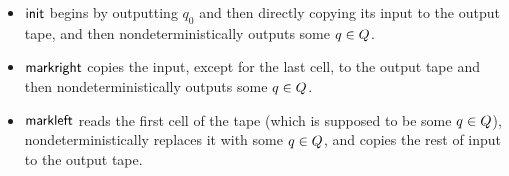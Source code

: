 \begin{itemize}
	\item
	$\mathsf{init}$ begins by outputting $q_0$ and then directly copying its input to
	the output tape, and then nondeterministically  outputs some $q\in Q$. 
	
	\item
	$\mathsf{markright}$ copies the input, except for the last cell, to the output tape and then nondeterministically  outputs some $q\in Q$.  
	
	
%	
	\item
	$\mathsf{markleft}$ reads the first cell of the tape (which is supposed to be some $q\in Q$), nondeterministically replaces it with some $q\in Q$, and copies the rest of input to the output tape. 
%	
%	
%	
\end{itemize}
